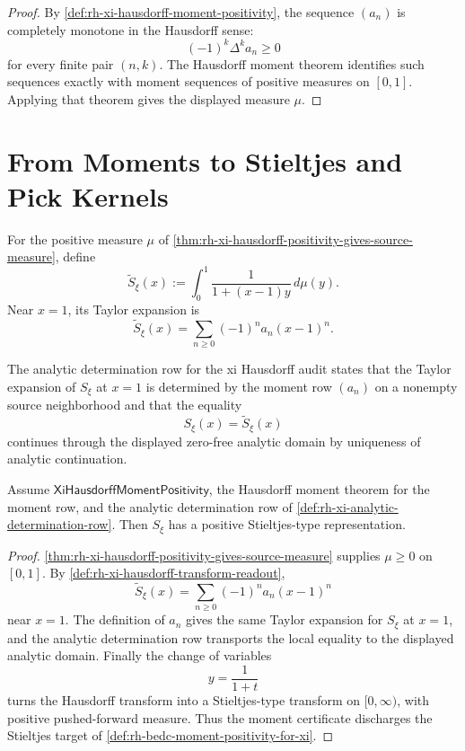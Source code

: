 \begin{proof}
By \autoref{def:rh-xi-hausdorff-moment-positivity}, the sequence
$(a_n)$ is completely monotone in the Hausdorff sense:
$$
(-1)^k\Delta^k a_n\ge0
$$
for every finite pair $(n,k)$. The Hausdorff moment theorem identifies
such sequences exactly with moment sequences of positive measures on
$[0,1]$. Applying that theorem gives the displayed measure $\mu$.
\end{proof}

\section{From Moments to Stieltjes and Pick Kernels}
\label{sec:rh-xi-hausdorff-to-pick}

\begin{definition}
\label{def:rh-xi-hausdorff-transform-readout}
For the positive measure $\mu$ of
\autoref{thm:rh-xi-hausdorff-positivity-gives-source-measure}, define
$$
\widetilde S_{\xi}(x)
:=
\int_0^1
\frac{1}{1+(x-1)y}
\,d\mu(y).
$$
Near $x=1$, its Taylor expansion is
$$
\widetilde S_{\xi}(x)
=
\sum_{n\ge0}
(-1)^n a_n (x-1)^n.
$$
\end{definition}

\begin{definition}
\label{def:rh-xi-analytic-determination-row}
The analytic determination row for the xi Hausdorff audit states that
the Taylor expansion of $S_{\xi}$ at $x=1$ is determined by the moment
row $(a_n)$ on a nonempty source neighborhood and that the equality
$$
S_{\xi}(x)=\widetilde S_{\xi}(x)
$$
continues through the displayed zero-free analytic domain by uniqueness
of analytic continuation.
\end{definition}

\begin{theorem}
\label{thm:rh-xi-hausdorff-audit-gives-stieltjes-target}
Assume $\mathsf{XiHausdorffMomentPositivity}$, the Hausdorff moment
theorem for the moment row, and the analytic determination row of
\autoref{def:rh-xi-analytic-determination-row}. Then
$S_{\xi}$ has a positive Stieltjes-type representation.
\end{theorem}

\begin{proof}
\autoref{thm:rh-xi-hausdorff-positivity-gives-source-measure} supplies
$\mu\ge0$ on $[0,1]$. By
\autoref{def:rh-xi-hausdorff-transform-readout},
$$
\widetilde S_{\xi}(x)
=
\sum_{n\ge0}(-1)^n a_n(x-1)^n
$$
near $x=1$. The definition of $a_n$ gives the same Taylor expansion for
$S_{\xi}$ at $x=1$, and the analytic determination row transports the
local equality to the displayed analytic domain. Finally the change of
variables
$$
y=\frac1{1+t}
$$
turns the Hausdorff transform into a Stieltjes-type transform on
$[0,\infty)$, with positive pushed-forward measure. Thus the moment
certificate discharges the Stieltjes target of
\autoref{def:rh-bedc-moment-positivity-for-xi}.
\end{proof}


